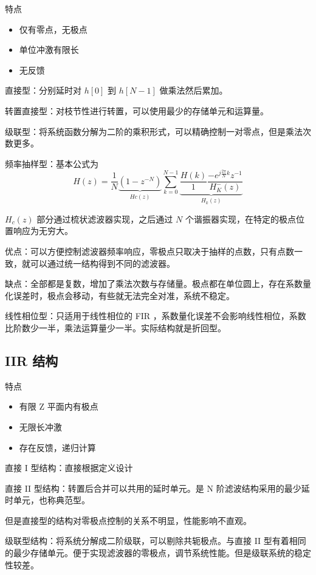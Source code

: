 \documentclass[cn,11pt,chinese,black,simple]{elegantbook}
\begin{document}
特点

\begin{itemize}
    \item 仅有零点，无极点
    \item 单位冲激有限长
    \item 无反馈
\end{itemize}

直接型：分别延时对 \(h[0]\) 到 \(h[N-1]\) 做乘法然后累加。

转置直接型：对枝节性进行转置，可以使用最少的存储单元和运算量。

级联型：将系统函数分解为二阶的乘积形式，可以精确控制一对零点，但是乘法次数更多。

频率抽样型：基本公式为 \[
    H(z)=\frac{1}{N} \underbrace{\left(1-z^{-N}\right)}_{H c(z)} \sum_{k=0}^{N-1} \underbrace{\frac{H(k)}{1} \frac{-e^{j \frac{2 \pi}{N} k} z^{-1}}{H_{K}^{-}(z)}}_{H_{k}(z)}
    \]

\(H_c(z)\) 部分通过梳状滤波器实现，之后通过 \(N\) 个谐振器实现，在特定的极点位置响应为无穷大。

优点：可以方便控制滤波器频率响应，零极点只取决于抽样的点数，只有点数一致，就可以通过统一结构得到不同的滤波器。

缺点：全部都是复数，增加了乘法次数与存储量。极点都在单位圆上，存在系数量化误差时，极点会移动，有些就无法完全对准，系统不稳定。

线性相位型：只适用于线性相位的 FIR ，系数量化误差不会影响线性相位，系数比阶数少一半，乘法运算量少一半。实际结构就是折回型。

\subsection{IIR 结构}

特点

\begin{itemize}
    \item 有限 Z 平面内有极点
    \item 无限长冲激
    \item 存在反馈，递归计算
\end{itemize}

直接 I 型结构：直接根据定义设计

直接 II 型结构：转置后合并可以共用的延时单元。是 N 阶滤波结构采用的最少延时单元，也称典范型。

但是直接型的结构对零极点控制的关系不明显，性能影响不直观。

级联型结构：将系统分解成二阶级联，可以剔除共轭极点。与直接 II 型有着相同的最少存储单元。便于实现滤波器的零极点，调节系统性能。但是级联系统的稳定性较差。
\end{document}
